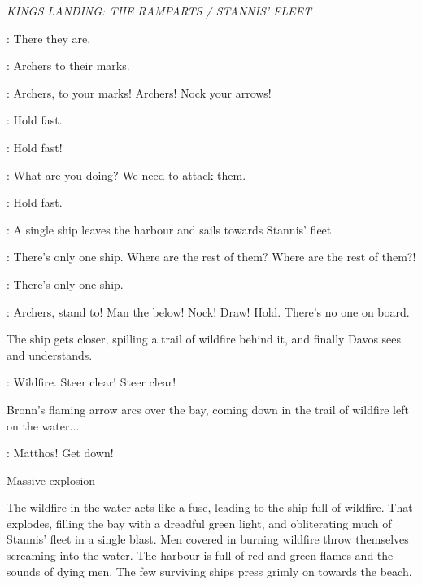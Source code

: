\scene

\textit{KINGS LANDING: THE RAMPARTS / STANNIS' FLEET} 


\JOFFREY: There they are. 

\TYRION: Archers to their marks. 

\SERGEANT: Archers, to your marks!  Archers! Nock your arrows! 

\TYRION: Hold fast. 

\SERGEANT: Hold fast! 

\JOFFREY: What are you doing? We need to attack them. 

\TYRION: Hold fast. 

\NARRATOR: A single ship leaves the harbour and sails towards Stannis' fleet 

\JOFFREY: There's only one ship. Where are the rest of them? Where are the rest of them?! 

\MATTHOS: There's only one ship. 

\DAVOS:  Archers, stand to! Man the below! Nock! Draw! Hold.  There's no one on board. 

\n The ship gets closer, spilling a trail of wildfire behind it, and finally Davos sees and understands. 

\DAVOS: Wildfire. Steer clear! Steer clear! 


\n Bronn's flaming arrow arcs over the bay, coming down in the trail of wildfire left on the water$\ldots$

\DAVOS: Matthos! Get down! 

\sfx Massive explosion



\n The wildfire in the water acts like a fuse, leading to the ship full of wildfire. That explodes, filling the bay with a dreadful green light, and obliterating much of Stannis' fleet in a single blast. Men covered in burning wildfire throw themselves screaming into the water. The harbour is full of red and green flames and the sounds of dying men. The few surviving ships press grimly on towards the beach.

